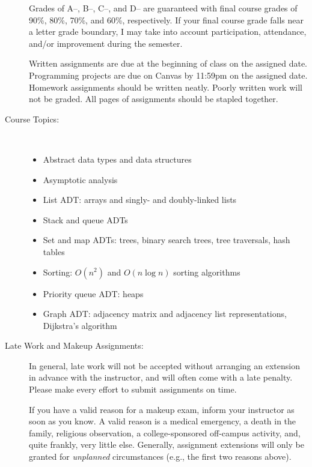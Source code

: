 \documentclass [letterpaper,11pt]{article}
\begin{document}
\begin{description}
Grades of A--, B--, C--, and D-- are guaranteed with final course grades of 90\%, 80\%,
70\%, and 60\%, respectively.  If your final course grade falls near a letter grade boundary,
I may take into account participation, attendance, and/or improvement during the semester.

Written assignments are due at the beginning of class on the assigned date. Programming
projects are due on Canvas by 11:59pm on the assigned date.  Homework assignments should be
written neatly. Poorly written work will not be graded. All pages of assignments should be
stapled together.

\item[Course Topics:]\
\begin{itemize} %
	\item Abstract data types and data structures
	\item Asymptotic analysis
	\item List ADT: arrays and singly- and doubly-linked lists
	\item Stack and queue ADTs
	\item Set and map ADTs: trees, binary search trees, tree traversals, hash tables
	\item Sorting: $O(n^2)$ and $O(n \log n)$ sorting algorithms
	\item Priority queue ADT: heaps
	\item Graph ADT: adjacency matrix and adjacency list representations, Dijkstra's algorithm
\end{itemize}

\item[Late Work and Makeup Assignments:]
In general, late work will not be accepted without arranging an extension in advance
with the instructor, and will often come with a late penalty.
Please make every effort to submit assignments on time.

If you have a valid reason for a makeup exam, inform your instructor
   as soon as you know.  A valid reason is a medical emergency, a death in the family, 
   religious observation, a college-sponsored off-campus activity, and, quite frankly, 
   very little else.  Generally, assignment extensions will only be granted for 
   \emph{unplanned} circumstances (e.g., the first two reasons above). 


\end{description}
\end{document}
